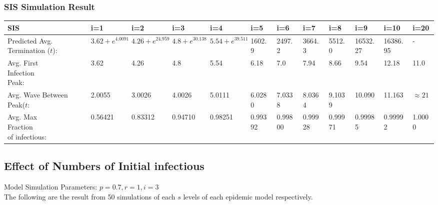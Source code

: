 \documentclass{subfile}
\begin{document}
  \subsubsection{SIS Simulation Result}
  \begin{adjustbox}{max width=1.2\textwidth,center}
    \begin{tabular}{|l|l|l|l|l|l|l|l|l|l|l|l|}
      \hline
      SIS & i=1 & i=2 & i=3 & i=4 & i=5 & i=6 & i=7 & i=8 & i=9 & i=10 & i=20\\
      \hline
      \makecell{Predicted\\Avg.\\Termination\\(\(t\))}\footnotemark: & \(3.62 + e^{4.0091}\) & \(4.26 + e^{24.959}\) & \(4.8 + e^{30.138}\) & \(5.54 + e^{39.511}\) & 1602.9 & 2497.2 & 3664.3 & 5512.0 & 16532.27 & 16386.95 & -\footnotemark\\
      \hline
      \makecell{Avg. First\\Infection\\Peak:} & 3.62& 4.26& 4.8& 5.54& 6.18& 7.0& 7.94& 8.66& 9.54& 12.18 & 11.0\footnotemark\\
      \hline
      \makecell{Avg. Wave\\Between Peak(\(t\):} & 2.0055 & 3.0026 & 4.0026 & 5.0111 & 6.0280 & 7.0338 & 8.0364 & 9.1039 & 10.090 & 11.163 & \(\approx21\)\footnotemark\\
      \hline
      \makecell{Avg. Max\\Fraction\\of infectious:} & 0.56421& 0.83312& 0.94710& 0.98251& 0.99392& 0.99800&
 0.99928& 0.99971&  0.99985& 0.99992& 1.0000\\
      \hline
    \end{tabular}
  \end{adjustbox}

  \subsection{Effect of Numbers of Initial infectious}
  Model Simulation Parameters: \(p=0.7, r=1, i=3\)\\
  The following are the result from 50 simulations of each \(s\) levels of each epidemic model respectively.
\end{document}

